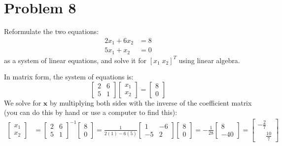 \documentclass[11pt,twoside]{article}
\newcommand{\?}{\stackrel{?}{=}}
\newcommand{\fr}{\frac}
\newcommand{\bl}{\color{blue}}
\newenvironment{solution}{\begin{adjustwidth}{.05\textwidth}{}\bl}{\medskip\end{adjustwidth}}
\begin{document}
\section*{Problem 8 }
Reformulate the two equations:
\begin{align*}
  2x_{1} + 6x_{2} &= 8 \\
  5x_{1} + x_{2} &= 0 
\end{align*}
as a system of linear equations, and solve it for $[x_{1} \; x_{2}]^{T}$ using linear algebra.
\begin{solution}
  In matrix form, the system of equations is:
  \begin{equation*}
    \begin{bmatrix}
      2 & 6 \\ 5 & 1 
    \end{bmatrix}
    \begin{bmatrix}
      x_{1}\\ x_{2}
    \end{bmatrix}
    =
    \begin{bmatrix}
      8 \\ 0
    \end{bmatrix}
  \end{equation*}
  We solve for $\bm x$ by multiplying both sides with the inverse of the coefficient matrix (you can do this by hand or use a computer to find this):
  \begin{align*}
    \begin{bmatrix}
      x_{1}\\ x_{2}
    \end{bmatrix}
   & =  
    \begin{bmatrix}
      2 & 6 \\ 5 & 1 
    \end{bmatrix}^{-1}
    \begin{bmatrix}
      8 \\ 0
    \end{bmatrix}  = \fr{1}{2(1) - 6(5)}
      \begin{bmatrix}
        1 & -6 \\
        -5 & 2 
      \end{bmatrix}
    \begin{bmatrix}
      8 \\ 0
    \end{bmatrix}    =
    -\fr{1}{28}
    \begin{bmatrix}
      8 \\-40
    \end{bmatrix} =
    \begin{bmatrix}
      -\fr27 \\[2mm] \phantom{-}\fr{10}7
    \end{bmatrix}
  \end{align*}
\end{solution}
\end{document}
